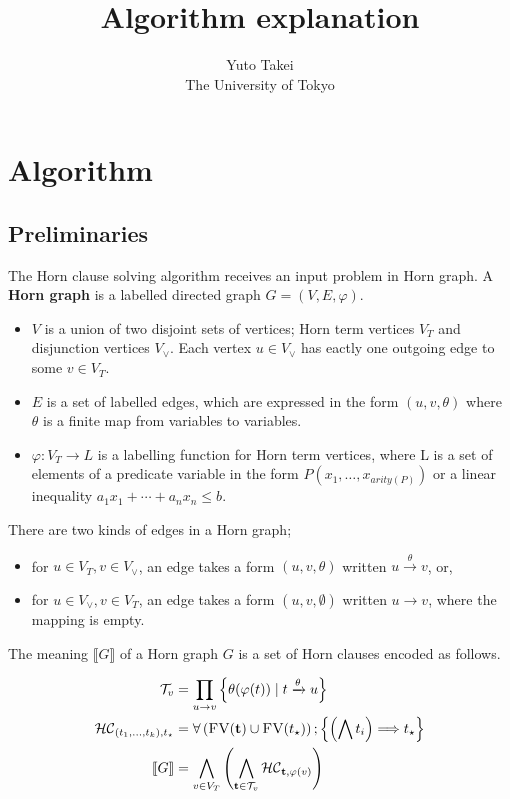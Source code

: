 \documentclass[a4paper,12pt]{article}
\title{Algorithm explanation}
\author{Yuto Takei \\ The University of Tokyo}
\begin{document}
\maketitle

\section{Algorithm}

\subsection{Preliminaries}

The Horn clause solving algorithm receives an input problem in Horn
graph. A \textbf{Horn graph} is a labelled directed graph $G=(V,E,\varphi)$.
\begin{itemize}
\item $V$ is a union of two disjoint sets of vertices; Horn term
  vertices $V_T$ and disjunction vertices $V_\vee$. Each vertex $u \in
  V_\vee$ has eactly one outgoing edge to some $v \in V_T$.
\item $E$ is a set of labelled edges, which are expressed in the form
  $(u,v,\theta)$ where $\theta$ is a finite map from variables to
  variables.
\item $\varphi: V_T \rightarrow L$ is a labelling function for Horn
  term vertices, where L is a set of elements of a predicate variable
  in the form $P(x_1, \ldots, x_{arity(P)})$ or a linear inequality
  $a_1 x_1 + \cdots + a_n x_n \leq b$.
\end{itemize}
There are two kinds of edges in a Horn graph;
\begin{itemize}
\item for $u \in V_T, v \in V_\vee$, an edge takes a form
  $(u,v,\theta)$ written $u \xrightarrow{\theta} v$, or,
\item for $u \in V_\vee, v \in V_T$, an edge takes a form
  $(u,v,\emptyset)$ written $u \rightarrow v$, where the mapping is
  empty.
\end{itemize}

The meaning $\llbracket G \rrbracket $ of a Horn graph $G$ is a set of
Horn clauses encoded as follows.

\begin{align*}
\mathcal{T}_v & = \prod_{u \rightarrow v}
 \left\lbrace \theta (\varphi (t)) \mid t \xrightarrow{\theta} u \right\rbrace \\
\mathcal{HC}_{(t_1,\ldots,t_k),t_\star} & = \forall \left(\textsc{FV}(\mathbf{t}) \cup \textsc{FV}(t_\star) \right);
 \left\lbrace \left( \bigwedge t_i \right) \Longrightarrow t_\star \right\rbrace \\
\llbracket G \rrbracket & = \bigwedge_{v \in V_T}
 \left(\bigwedge_{\mathbf{t} \in \mathcal{T}_v} \mathcal{HC}_{\mathbf{t},\varphi (v)} \right)
\end{align*}
\end{document}
